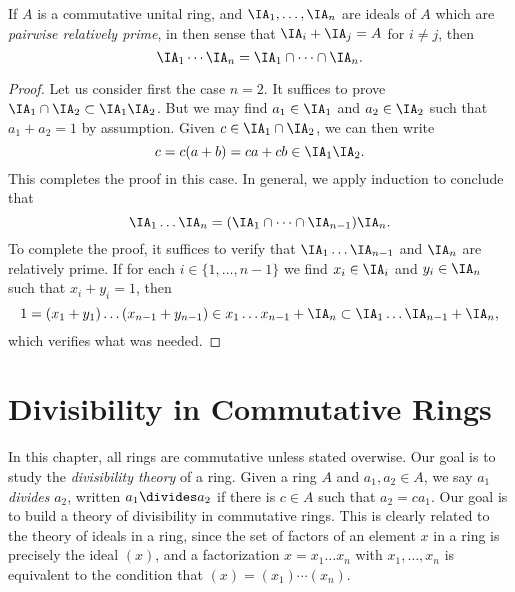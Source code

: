 \begin{lemma}
    If $A$ is a commutative unital ring, and $\IA_1,\dots, \IA_n$ are ideals of $A$ which are \emph{pairwise relatively prime}, in then sense that $\IA_i + \IA_j = A$ for $i \neq j$, then
    \[ \IA_1 \cdots \IA_n = \IA_1 \cap \dots \cap \IA_n. \]
\end{lemma}
\begin{proof}
    Let us consider first the case $n = 2$. It suffices to prove $\IA_1 \cap \IA_2 \subset \IA_1 \IA_2$. But we may find $a_1 \in \IA_1$ and $a_2 \in \IA_2$ such that $a_1 + a_2 = 1$ by assumption. Given $c \in \IA_1 \cap \IA_2$, we can then write
    \[ c = c(a + b) = ca + cb \in \IA_1 \IA_2. \qedhere \]
    This completes the proof in this case. In general, we apply induction to conclude that
    \[ \IA_1 \dots \IA_n = (\IA_1 \cap \dots \cap \IA_{n-1}) \IA_n. \]
    To complete the proof, it suffices to verify that $\IA_1 \dots \IA_{n-1}$ and $\IA_n$ are relatively prime. If for each $i \in \{ 1, \dots, n-1 \}$ we find $x_i \in \IA_i$ and $y_i \in \IA_n$ such that $x_i + y_i = 1$, then
    \[ 1 = (x_1 + y_1) \dots (x_{n-1} + y_{n-1}) \in x_1 \dots x_{n-1} + \IA_n \subset \IA_1 \dots \IA_{n-1} + \IA_n, \]
    which verifies what was needed.
\end{proof}

\chapter{Divisibility in Commutative Rings}

In this chapter, all rings are commutative unless stated overwise. Our goal is to study the \emph{divisibility theory} of a ring. Given a ring $A$ and $a_1,a_2 \in A$, we say $a_1$ \emph{divides} $a_2$, written $a_1 \divides a_2$ if there is $c \in A$ such that $a_2 = ca_1$. Our goal is to build a theory of divisibility in commutative rings. This is clearly related to the theory of ideals in a ring, since the set of factors of an element $x$ in a ring is precisely the ideal $(x)$, and a factorization $x = x_1 \dots x_n$ with $x_1, \dots, x_n$ is equivalent to the condition that $(x) = (x_1) \cdots (x_n)$.

